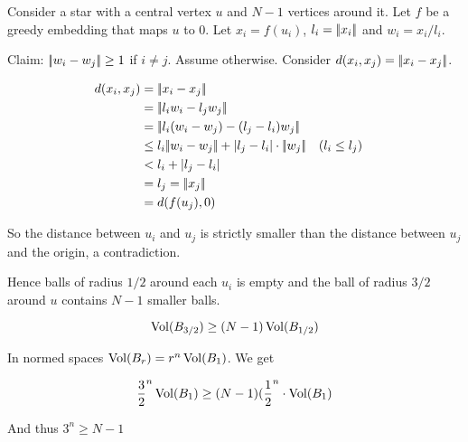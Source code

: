 \begin{pr} Consider a star with a central vertex $u$ and $N-1$ vertices around it. Let $f$ be a greedy embedding that maps $u$ to $0$. Let $x_i=f(u_i)$, $l_i=|\!|x_i|\!|$ and $w_i = x_i/l_i$.

Claim: $|\!|w_i-w_j|\!| \geq 1$ if $i\neq j$. Assume otherwise. Consider $d(x_i,x_j)=|\!|x_i-x_j|\!|$.

\begin{align*}
d(x_i,x_j)&=\norm{x_i - x_j} \\
	&=\norm{l_iw_i - l_jw_j}\\
	&=\norm{l_i(w_i-w_j) -(l_j-l_i)w_j}\\
  &\leq l_i \norm{w_i-w_j} + |l_j-l_i|\cdot \norm{w_j} && (l_i\leq l_j)\\
  &< l_i + |l_j-l_i|\\
  &=l_j = \norm{x_j}\\
  &=d(f(u_j),0)
\end{align*}

So the distance between $u_i$ and $u_j$ is strictly smaller than the distance between $u_j$ and the origin, a contradiction.

Hence balls of radius $1/2$ around each $u_i$ is empty and the ball of radius $3/2$ around $u$ contains $N-1$ smaller balls.

\[\operatorname{Vol}(B_{3/2}) \geq (N-1)\operatorname{Vol}(B_{1/2})\]

In normed spaces $\operatorname{Vol}(B_r) = r^n \operatorname{Vol}(B_1)$. We get

\[\frac{3}{2}^n \operatorname{Vol}(B_1) \geq (N-1)(\frac{1}{2}^n \cdot \operatorname{Vol}(B_1)\]

And thus $3^n\geq N-1$
\end{pr}
